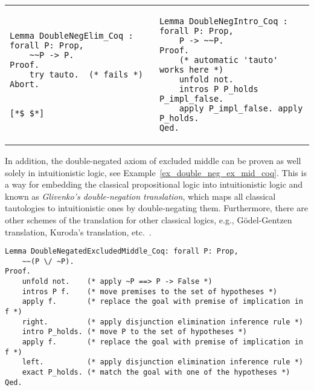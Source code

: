 \documentclass[article]{aaltoseries}
\begin{document}
\begin{raggedleft}
\begin{tabular}{p{.45\linewidth} p{.45\linewidth}}
\begin{lstlisting}[language=coq,
    caption={Proof failure of the \eqref{rule_double_negation_elim} rule in Coq},
    label=ex_double_neg_elim_coq]
Lemma DoubleNegElim_Coq : forall P: Prop,
    ~~P -> P.
Proof.
    try tauto.  (* fails *)
Abort.


[*$ $*]
\end{lstlisting} %
&
\begin{lstlisting}[language=coq,
    caption={Proof of the \eqref{rule_double_negation_elim} rule in Coq},
    label=ex_double_neg_intro_coq]
Lemma DoubleNegIntro_Coq : forall P: Prop,
    P -> ~~P.
Proof.
    (* automatic 'tauto' works here *)
    unfold not.
    intros P P_holds P_impl_false.
    apply P_impl_false. apply P_holds. 
Qed.
\end{lstlisting}
\end{tabular}
\end{raggedleft}

In addition, the double-negated axiom of excluded middle can be proven as well solely in intuitionistic logic, see Example~\ref{ex_double_neg_ex_mid_coq}. This is a way for embedding the classical propositional logic into intuitionistic logic and known as \textit{Glivenko's double-negation translation}\cite{Glivenko29}, which maps all classical tautologies to intuitionistic ones by double-negating them. Furthermore, there are other schemes of the translation for other classical logics, e.g., Gödel-Gentzen translation, Kuroda's translation, etc.~\cite{Kolmogorov25}.

\begin{lstlisting}[language=coq,
    caption={Proof of the double-negated excluded middle in Coq},
    label={ex_double_neg_ex_mid_coq},
    float,floatplacement=H]
Lemma DoubleNegatedExcludedMiddle_Coq: forall P: Prop,
    ~~(P \/ ~P).
Proof.
    unfold not.    (* apply ~P ==> P -> False *)
    intros P f.    (* move premises to the set of hypotheses *)
    apply f.       (* replace the goal with premise of implication in f *)
    right.         (* apply disjunction elimination inference rule *)
    intro P_holds. (* move P to the set of hypotheses *)
    apply f.       (* replace the goal with premise of implication in f *)
    left.          (* apply disjunction elimination inference rule *)
    exact P_holds. (* match the goal with one of the hypotheses *)
Qed.
\end{lstlisting}
\end{document}
